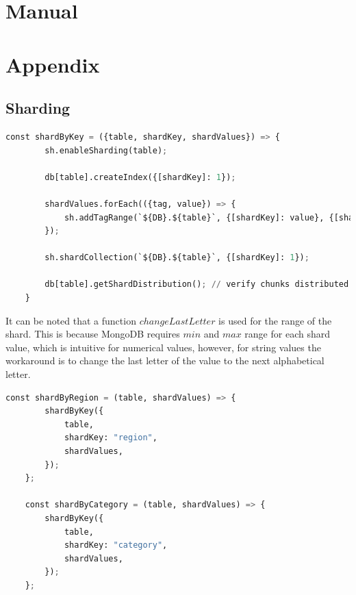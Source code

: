 \documentclass{article}
\begin{document}
    \section{Manual}

    \section{Appendix}
    \subsection{Sharding}\label{subsec:appendix-sharding}
    \begin{lstlisting}[language=Python, caption=General sharding function]
    const shardByKey = ({table, shardKey, shardValues}) => {
        sh.enableSharding(table);
    
        db[table].createIndex({[shardKey]: 1});
    
        shardValues.forEach(({tag, value}) => {
            sh.addTagRange(`${DB}.${table}`, {[shardKey]: value}, {[shardKey]: changeLastLetter(value)}, tag);
        });
    
        sh.shardCollection(`${DB}.${table}`, {[shardKey]: 1});
    
        db[table].getShardDistribution(); // verify chunks distributed on shards
    }
    \end{lstlisting}
    It can be noted that a function $changeLastLetter$ is used for the range of the shard. This is because MongoDB requires $min$ and $max$ range for each shard value, which is intuitive for numerical values, however, for string values the workaround is to change the last letter of the value to the next alphabetical letter.
    \begin{lstlisting}[language=Python, caption=Sharding per region and category]
    const shardByRegion = (table, shardValues) => {
        shardByKey({
            table,
            shardKey: "region",
            shardValues,
        });
    };
    
    const shardByCategory = (table, shardValues) => {
        shardByKey({
            table,
            shardKey: "category",
            shardValues,
        });
    };
    
    \end{lstlisting}
\end{document}
